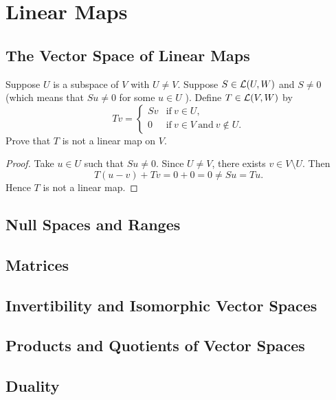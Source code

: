 \chapter{Linear Maps}

\section{The Vector Space of Linear Maps}

\begin{exercise}{10}
	Suppose \( U \) is a subspace of \( V \) with \( U \neq V \). Suppose \( S \in \operatorname{\mathcal{L}}(U, W) \) and \( S \neq 0 \) (which means that \( Su \neq 0 \) for some \( u \in U \) ). Define \( T \in \operatorname{\mathcal{L}}(V, W) \) by
	\[
		Tv = \begin{cases}
			Sv & \text{if} \ v \in U, \\
			0  & \text{if} \ v \in V \ \text{and} \ v \not\in U.
		\end{cases}
	\]
Prove that \( T \) is not a linear map on \( V \).
\end{exercise}

\begin{proof}
	Take \( u \in U \) such that \( Su \neq 0 \). Since \( U \neq V \), there exists \( v \in V \setminus U \). Then
	\[
		T(u - v) + Tv = 0 + 0 = 0 \neq Su = Tu.
	\]
	Hence \( T \) is not a linear map.
\end{proof}

\section{Null Spaces and Ranges}

\section{Matrices}

\section{Invertibility and Isomorphic Vector Spaces}

\section{Products and Quotients of Vector Spaces}

\section{Duality}
